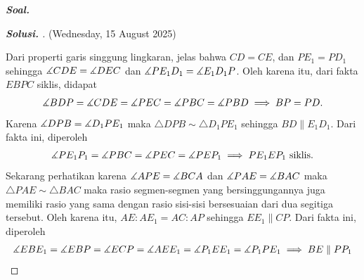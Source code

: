 \textbf{\textit{Soal.}} 

\begin{proof}[\textbf{Solusi. }] (Wednesday, 15 August 2025)
    
    Dari properti garis singgung lingkaran, jelas bahwa $CD=CE$, dan $PE_1=PD_1$ sehingga $\measuredangle CDE = \measuredangle DEC$ dan $\measuredangle PE_1D_1 = \measuredangle E_1D_1P$. 
    Oleh karena itu, dari fakta $EBPC$ siklis, didapat
    \begin{align*}
        \measuredangle BDP = \measuredangle CDE = \measuredangle PEC = \measuredangle PBC = \measuredangle PBD \implies BP = PD.
    \end{align*}
    Karena $\measuredangle DPB = \measuredangle D_1PE_1$ maka $\triangle DPB \sim \triangle D_1PE_1$ sehingga $BD \parallel E_1D_1$. Dari fakta ini, diperoleh
    \begin{align*}
        \measuredangle PE_1P_1 = \measuredangle PBC = \measuredangle PEC = \measuredangle PEP_1 \implies PE_1EP_1 \text{ siklis}.
    \end{align*}
    Sekarang perhatikan karena $\measuredangle APE = \measuredangle BCA$ dan $\measuredangle PAE = \measuredangle BAC$ 
    maka $\triangle PAE \sim \triangle BAC$ maka rasio segmen-segmen yang bersinggungannya juga memiliki rasio yang sama dengan rasio sisi-sisi bersesuaian dari dua segitiga tersebut.
    Oleh karena itu, $AE:AE_1 = AC:AP$ sehingga $EE_1 \parallel CP$. Dari fakta ini, diperoleh
    \begin{align*}
        \measuredangle EBE_1 = \measuredangle EBP = \measuredangle ECP = \measuredangle AEE_1 = \measuredangle P_1EE_1 = \measuredangle P_1PE_1 \implies BE \parallel PP_1
    \end{align*}
\end{proof}